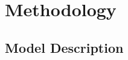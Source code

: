 \documentclass[draft]{agujournal2019}
\begin{document}



\section{Methodology}\label{methods}


\subsection{Model Description}
\end{document}
